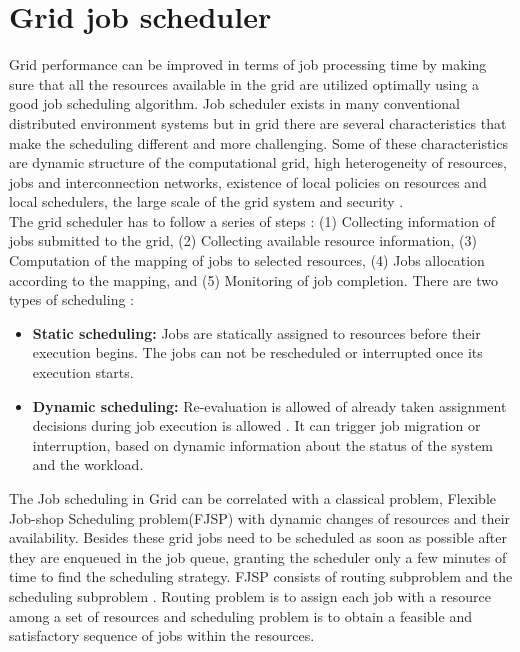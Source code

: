 \section{Grid job scheduler}
Grid performance can be improved in terms of job processing time by making sure that all the resources available in the grid are utilized optimally using a good job
scheduling algorithm. Job scheduler exists in many conventional distributed environment systems but in grid there are several characteristics that make the scheduling different and more challenging. Some of these characteristics are dynamic structure of the computational grid, high heterogeneity of resources, jobs and interconnection networks, existence of local policies on resources and local schedulers, the large scale of the grid system and security \cite{xhafa2010computational}.\\
The grid scheduler has to follow a series of steps \cite{nabrzyski2004grid} : (1) Collecting information of jobs submitted to the grid, (2) Collecting available resource information, (3) Computation of the mapping of jobs to selected resources, (4) Jobs allocation according to the mapping, and (5) Monitoring of job completion.
There are two types of scheduling :
\begin{itemize}
\item \textbf{Static scheduling:} Jobs are statically assigned to resources before their execution begins. The jobs can not be rescheduled or interrupted once its execution starts.
\item \textbf{Dynamic scheduling:} Re-evaluation is allowed of already taken assignment decisions during job execution is allowed\cite{chtepen2005dynamic} . It can trigger job migration or interruption, based on dynamic information about the status of the system and the workload.
\end{itemize}
The Job scheduling in Grid can be correlated with a classical problem, Flexible Job-shop Scheduling problem(FJSP) \cite{brucker1990job} with dynamic changes of resources and their availability. Besides these grid jobs need to be scheduled as soon as possible after they are enqueued in the job queue, granting the scheduler only a few minutes of time to find the scheduling strategy. FJSP consists of routing subproblem and the scheduling subproblem \cite{wang2012enhanced}. Routing problem is to assign each job with a resource among a set of resources and scheduling problem is to obtain a feasible and satisfactory sequence of jobs within the resources.\\
